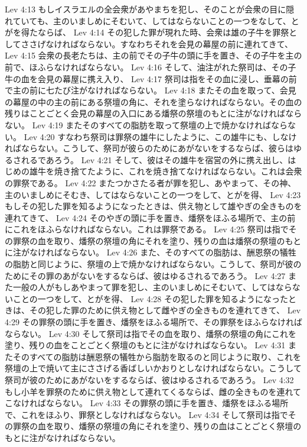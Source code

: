 Lev 4:13  もしイスラエルの全会衆があやまちを犯し、そのことが会衆の目に隠れていても、主のいましめにそむいて、してはならないことの一つをなして、とがを得たならば、
Lev 4:14  その犯した罪が現れた時、会衆は雄の子牛を罪祭としてささげなければならない。すなわちそれを会見の幕屋の前に連れてきて、
Lev 4:15  会衆の長老たちは、主の前でその子牛の頭に手を置き、その子牛を主の前で、ほふらなければならない。
Lev 4:16  そして、油注がれた祭司は、その子牛の血を会見の幕屋に携え入り、
Lev 4:17  祭司は指をその血に浸し、垂幕の前で主の前に七たび注がなければならない。
Lev 4:18  またその血を取って、会見の幕屋の中の主の前にある祭壇の角に、それを塗らなければならない。その血の残りはことごとく会見の幕屋の入口にある燔祭の祭壇のもとに注がなければならない。
Lev 4:19  またそのすべての脂肪を取って祭壇の上で焼かなければならない。
Lev 4:20  すなわち祭司は罪祭の雄牛にしたように、この雄牛にも、しなければならない。こうして、祭司が彼らのためにあがないをするならば、彼らはゆるされるであろう。
Lev 4:21  そして、彼はその雄牛を宿営の外に携え出し、はじめの雄牛を焼き捨てたように、これを焼き捨てなければならない。これは会衆の罪祭である。
Lev 4:22  またつかさたる者が罪を犯し、あやまって、その神、主のいましめにそむき、してはならないことの一つをして、とがを得、
Lev 4:23  もしその犯した罪を知るようになったときは、供え物として雄やぎの全きものを連れてきて、
Lev 4:24  そのやぎの頭に手を置き、燔祭をほふる場所で、主の前にこれをほふらなければならない。これは罪祭である。
Lev 4:25  祭司は指でその罪祭の血を取り、燔祭の祭壇の角にそれを塗り、残りの血は燔祭の祭壇のもとに注がなければならない。
Lev 4:26  また、そのすべての脂肪は、酬恩祭の犠牲の脂肪と同じように、祭壇の上で焼かなければならない。こうして、祭司が彼のためにその罪のあがないをするならば、彼はゆるされるであろう。
Lev 4:27  また一般の人がもしあやまって罪を犯し、主のいましめにそむいて、してはならないことの一つをして、とがを得、
Lev 4:28  その犯した罪を知るようになったときは、その犯した罪のために供え物として雌やぎの全きものを連れてきて、
Lev 4:29  その罪祭の頭に手を置き、燔祭をほふる場所で、その罪祭をほふらなければならない。
Lev 4:30  そして祭司は指でその血を取り、燔祭の祭壇の角にこれを塗り、残りの血をことごとく祭壇のもとに注がなければならない。
Lev 4:31  またそのすべての脂肪は酬恩祭の犠牲から脂肪を取るのと同じように取り、これを祭壇の上で焼いて主にささげる香ばしいかおりとしなければならない。こうして祭司が彼のためにあがないをするならば、彼はゆるされるであろう。
Lev 4:32  もし小羊を罪祭のために供え物として連れてくるならば、雌の全きものを連れてこなければならない。
Lev 4:33  その罪祭の頭に手を置き、燔祭をほふる場所で、これをほふり、罪祭としなければならない。
Lev 4:34  そして祭司は指でその罪祭の血を取り、燔祭の祭壇の角にそれを塗り、残りの血はことごとく祭壇のもとに注がなければならない。
